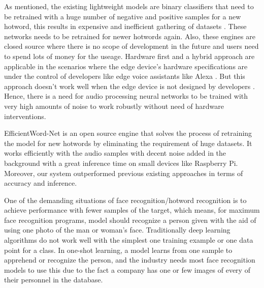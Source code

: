 \documentclass[10pt,twocolumn]{article}
\begin{document}
As mentioned, the existing lightweight models \cite{Yang_Jee_Leblanc_Weaver_Armand_2020,kalith_2012} are binary classifiers that need to be retrained with a huge number of negative and positive samples for a new hotword, this results in expensive and inefficient gathering of datasets \cite{kalith_2012}. These networks needs to be retrained for newer hotwords again. Also, these engines are closed source where there is no scope of development in the future and users need to spend lots of money for the useage. Hardware first and a hybrid approach are applicable in the scenarios where the edge device’s hardware specifications are under the control of developers like edge voice assistants like Alexa \cite{Huang_2019}. But this approach doesn’t work well when the edge device is not designed by developers \cite{Huang_Yiteng_Wan_Li_2019}. Hence, there is a need for audio processing neural networks to be trained with very high amounts of noise to work robustly without need of hardware interventions.

EfficientWord-Net is an open source engine that solves the process of retraining the model for new hotwords by eliminating the requirement of huge datasets. It works efficiently with the audio samples with decent noise added in the background with a great inference time on small devices like Raspberry Pi. Moreover, our system outperformed previous existing approaches in terms of accuracy and inference.

\label{Sec:oneshotlearning}
One of the demanding situations of face recognition/hotword recognition is to achieve performance with fewer samples of the target, which means, for maximum face recognition programs, model should recognize a person given with the aid of using one photo of the man or woman's face. Traditionally deep learning algorithms do not work well with the simplest one training example or one data point for a class. In one-shot learning, a model learns from one sample to apprehend or recognize the person, and the industry needs most face recognition models to use this due to the fact a company has one or few images of every of their personnel in the database. 

\end{document}
